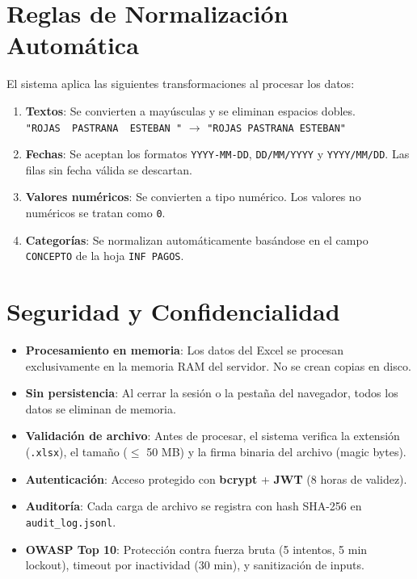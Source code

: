 \documentclass[11pt,a4paper]{article}
\begin{document}
\section{Reglas de Normalización Automática}

El sistema aplica las siguientes transformaciones al procesar los datos:

\begin{enumerate}
    \item \textbf{Textos}: Se convierten a mayúsculas y se eliminan espacios dobles.\\
    \texttt{"ROJAS~~PASTRANA~~ESTEBAN~"} $\rightarrow$ \texttt{"ROJAS PASTRANA ESTEBAN"}
    
    \item \textbf{Fechas}: Se aceptan los formatos \texttt{YYYY-MM-DD}, \texttt{DD/MM/YYYY} y \texttt{YYYY/MM/DD}. Las filas sin fecha válida se descartan.
    
    \item \textbf{Valores numéricos}: Se convierten a tipo numérico. Los valores no numéricos se tratan como \texttt{0}.
    
    \item \textbf{Categorías}: Se normalizan automáticamente basándose en el campo \texttt{CONCEPTO} de la hoja \texttt{INF PAGOS}.
\end{enumerate}

\section{Seguridad y Confidencialidad}

\begin{tcolorbox}[colback=rojo!5, colframe=rojo, title=\textbf{Política de Protección de Datos}]
\begin{itemize}[noitemsep]
    \item \textbf{Procesamiento en memoria}: Los datos del Excel se procesan exclusivamente en la memoria RAM del servidor. No se crean copias en disco.
    \item \textbf{Sin persistencia}: Al cerrar la sesión o la pestaña del navegador, todos los datos se eliminan de memoria.
    \item \textbf{Validación de archivo}: Antes de procesar, el sistema verifica la extensión (\texttt{.xlsx}), el tamaño ($\leq$ 50 MB) y la firma binaria del archivo (magic bytes).
    \item \textbf{Autenticación}: Acceso protegido con \textbf{bcrypt} + \textbf{JWT} (8 horas de validez).
    \item \textbf{Auditoría}: Cada carga de archivo se registra con hash SHA-256 en \texttt{audit\_log.jsonl}.
    \item \textbf{OWASP Top 10}: Protección contra fuerza bruta (5 intentos, 5 min lockout), timeout por inactividad (30 min), y sanitización de inputs.
\end{itemize}
\end{tcolorbox}
\end{document}
